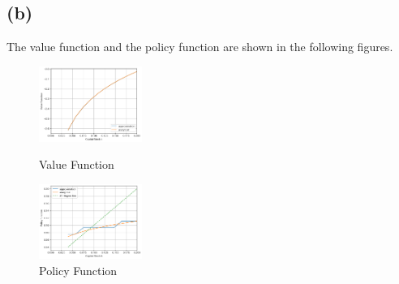 \documentclass{ltjsarticle}
\begin{document}
\subsection*{(b)}
The value function and the policy function are shown in the following figures.
\begin{figure}[H]
    \centering
    \begin{minipage}[b]{\textwidth}
        \centering
        \includegraphics[width=0.3\textwidth]{Q1B_VF.png}
        \caption{Value Function}
        \label{fig:value_function}
    \end{minipage}
    \begin{minipage}[b]{\textwidth}
        \centering
        \includegraphics[width=0.3\textwidth]{Q1B_PF.png}
        \caption{Policy Function}
        \label{fig:policy_function}
    \end{minipage}
    \label{fig:value_and_policy_functions}
\end{figure}
\end{document}

